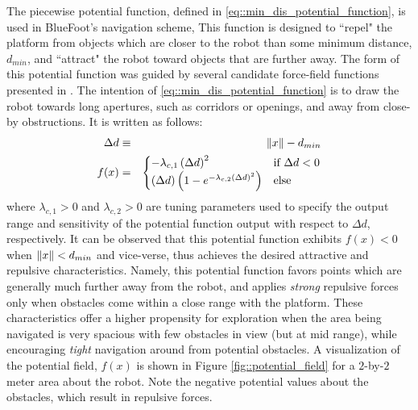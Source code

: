 			The piecewise potential function, defined in \ref{eq::min_dis_potential_function}, is used in BlueFoot's navigation scheme, This function is designed to ``repel" the platform from objects which are closer to the robot than some minimum distance, $d_{min}$, and ``attract" the robot toward objects that are further away. The form of this potential function was guided by several candidate force-field functions presented in \cite{ArambulaCosio2004}. The intention of \ref{eq::min_dis_potential_function} is to draw the robot towards long apertures, such as corridors or openings, and away from close-by obstructions. It is written as follows:
				\begin{eqnarray}
					\Delta d &\equiv& \left\lVert x\right\rVert-d_{min} \nonumber \\
					f(x) &=& 
					\begin{cases}	
					 	 -\lambda_{c,1} \left(\Delta d\right)^{2} &  \text{if } \Delta d < 0 \\
						\left(\Delta d\right) \left( 1  - e^{ -  \lambda_{c,2} { \left(\Delta d\right) }^{2} } \right) 	&  \text{else}
					\end{cases}
				\label{eq::min_dis_potential_function}
				\end{eqnarray}
			where $\lambda_{c,1}>0$ and $\lambda_{c,2}>0$ are tuning parameters used to specify the output range and sensitivity of the potential function output with respect to $\Delta d$, respectively. It can be observed that this potential function exhibits $f(x)<0$ when $\left\lVert x\right\rVert < d_{min}$ and vice-verse, thus achieves the desired attractive and repulsive characteristics. Namely, this potential function favors points which are generally much further away from the robot, and applies \emph{strong} repulsive forces only when obstacles come within a close range with the platform. These characteristics offer a higher propensity for exploration when the area being navigated is very spacious with few obstacles in view (but at mid range), while encouraging \emph{tight} navigation around from potential obstacles. A visualization of  the potential field, $f(x)$ is shown in Figure \ref{fig::potential_field} for a $2$-by-$2$ meter area about the robot. Note the negative potential values about the obstacles, which result in repulsive forces.
